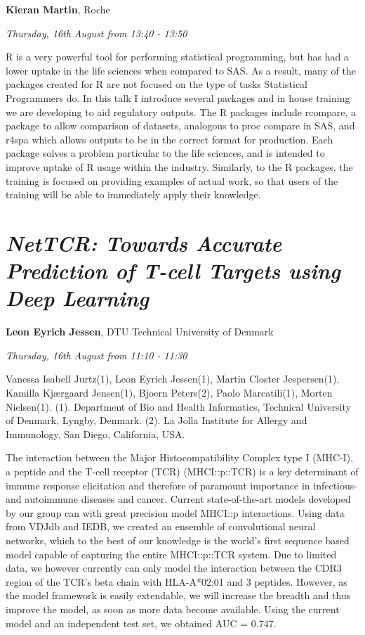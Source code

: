 \documentclass[]{book}
\theoremstyle{definition}
\theoremstyle{definition}
\theoremstyle{definition}
\theoremstyle{remark}
\begin{document}
\textbf{Kieran Martin}, Roche

\emph{Thursday, 16th August from 13:40 - 13:50}

R is a very powerful tool for performing statistical programming, but
has had a lower uptake in the life sciences when compared to SAS. As a
result, many of the packages created for R are not focused on the type
of tasks Statistical Programmers do. In this talk I introduce several
packages and in house training we are developing to aid regulatory
outputs. The R packages include rcompare, a package to allow comparison
of datasets, analogous to proc compare in SAS, and r4spa which allows
outputs to be in the correct format for production. Each package solves
a problem particular to the life sciences, and is intended to improve
uptake of R usage within the industry. Similarly, to the R packages, the
training is focused on providing examples of actual work, so that users
of the training will be able to immediately apply their knowledge.

\hypertarget{nettcr-towards-accurate-prediction-of-t-cell-targets-using-deep-learning}{%
\section{\texorpdfstring{\emph{NetTCR: Towards Accurate Prediction of
T-cell Targets using Deep
Learning}}{NetTCR: Towards Accurate Prediction of T-cell Targets using Deep Learning}}\label{nettcr-towards-accurate-prediction-of-t-cell-targets-using-deep-learning}}

\textbf{Leon Eyrich Jessen}, DTU Technical University of Denmark

\emph{Thursday, 16th August from 11:10 - 11:30}

Vanessa Isabell Jurtz(1), Leon Eyrich Jessen(1), Martin Closter
Jespersen(1), Kamilla Kjærgaard Jensen(1), Bjoern Peters(2), Paolo
Marcatili(1), Morten Nielsen(1). (1). Department of Bio and Health
Informatics, Technical University of Denmark, Lyngby, Denmark. (2). La
Jolla Institute for Allergy and Immunology, San Diego, California, USA.

The interaction between the Major Histocompatibility Complex type I
(MHC-I), a peptide and the T-cell receptor (TCR) (MHCI::p::TCR) is a key
determinant of immune response elicitation and therefore of paramount
importance in infectious- and autoimmune diseases and cancer. Current
state-of-the-art models developed by our group can with great precision
model MHCI::p interactions. Using data from VDJdb and IEDB, we created
an ensemble of convolutional neural networks, which to the best of our
knowledge is the world's first sequence based model capable of capturing
the entire MHCI::p::TCR system. Due to limited data, we however
currently can only model the interaction between the CDR3 region of the
TCR's beta chain with HLA-A*02:01 and 3 peptides. However, as the model
framework is easily extendable, we will increase the breadth and thus
improve the model, as soon as more data become available. Using the
current model and an independent test set, we obtained AUC = 0.747.
\end{document}
